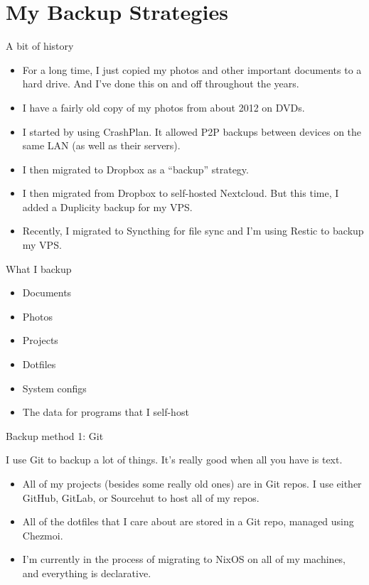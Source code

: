 \documentclass{lug}
\begin{document}
\section{My Backup Strategies}

\begin{frame}{A bit of history}

    \begin{itemize}[<+->]
        \item For a long time, I just copied my photos and other important
            documents to a hard drive. And I've done this on and off throughout
            the years.
        \item I have a fairly old copy of my photos from about 2012 on DVDs.
        \item I started by using CrashPlan. It allowed P2P backups between
            devices on the same LAN (as well as their servers).
        \item I then migrated to Dropbox as a ``backup'' strategy.
        \item I then migrated from Dropbox to self-hosted Nextcloud. But this
            time, I added a Duplicity backup for my VPS.
        \item Recently, I migrated to Syncthing for file sync and I'm using
            Restic to backup my VPS.
    \end{itemize}

\end{frame}

\begin{frame}{What I backup}

    \begin{itemize}
        \item Documents
        \item Photos
        \item Projects
        \item Dotfiles
        \item System configs
        \item The data for programs that I self-host
    \end{itemize}

\end{frame}

\begin{frame}{Backup method 1: Git}

    I use Git to backup a lot of things. It's really good when all you have is
    text.
    \pause

    \begin{itemize}[<+->]
        \item All of my projects (besides some really old ones) are in Git
            repos. I use either GitHub, GitLab, or Sourcehut to host all of my
            repos.
        \item All of the dotfiles that I care about are stored in a Git repo,
            managed using Chezmoi.
        \item I'm currently in the process of migrating to NixOS on all of my
            machines, and everything is declarative.
    \end{itemize}

\end{frame}
\end{document}
